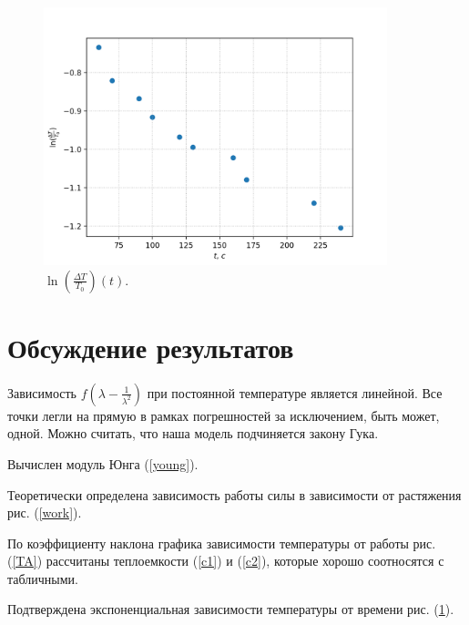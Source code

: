 \documentclass[a4paper,12pt]{article} %
\begin{document}
\begin{figure}[h!]\label{Tt}
\begin{center}
\includegraphics[width=0.89\textwidth]{T(t).png}
\caption{$\ln(\frac{\Delta T}{T_0})(t)$.}
\end{center}
\end{figure}

\FloatBarrier

\section*{Обсуждение результатов}

Зависимость $f(\lambda - \frac{1}{\lambda^2})$ при постоянной температуре является линейной. Все точки легли на прямую в рамках погрешностей за исключением, быть может, одной. Можно считать, что наша модель подчиняется закону Гука.

Вычислен модуль Юнга (\ref{young}).

Теоретически определена зависимость работы силы в зависимости от растяжения рис. (\ref{work}).

По коэффициенту наклона графика зависимости температуры от работы рис. (\ref{TA}) рассчитаны теплоемкости (\ref{c1}) и (\ref{c2}), которые хорошо соотносятся с табличными.

Подтверждена экспоненциальная зависимости температуры от времени рис. (\ref{Tt}).
\end{document}
